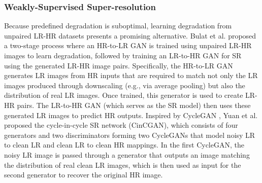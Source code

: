 \subsubsection{Weakly-Supervised Super-resolution}
Because predefined degradation is suboptimal, learning degradation from unpaired LR-HR datasets presents a promising alternative. Bulat et al. \cite{s24} proposed a two-stage process where an HR-to-LR GAN is trained using unpaired LR-HR images to learn degradation, followed by training an LR-to-HR GAN for SR using the generated LR-HR image pairs. Specifically, the HR-to-LR GAN generates LR images from HR inputs that are required to match not only the LR images produced through downscaling (e.g., via average pooling) but also the distribution of real LR images. Once trained, this generator is used to create LR-HR pairs. The LR-to-HR GAN (which serves as the SR model) then uses these generated LR images to predict HR outputs. Inspired by CycleGAN \cite{s25}, Yuan et al. \cite{s26} proposed the cycle-in-cycle SR network (CinCGAN), which consists of four generators and two discriminators forming two CycleGANs that model noisy LR to clean LR and clean LR to clean HR mappings. In the first CycleGAN, the noisy LR image is passed through a generator that outputs an image matching the distribution of real clean LR images, which is then used as input for the second generator to recover the original HR image.

